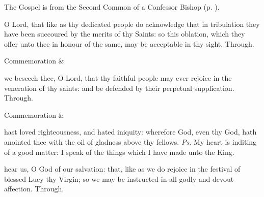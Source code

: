 
\begin{rubric}
	The Gospel is from the Second Common of a Confessor Bishop (p. \pageref{CommonConfessorBishopIIGospel}).
\end{rubric}


\secret
{} O Lord, that like as thy dedicated people do acknowledge that in tribulation they have been succoured by the merits of thy Saints: so this oblation, which they offer unto thee in honour of the same, may be acceptable in thy sight. Through.

\begin{rubric}
	Commemoration  \& 
\end{rubric}


\postcommunion
{} we beseech thee, O Lord, that thy faithful people may ever rejoice in the veneration of thy saints: and be defended by their perpetual supplication. Through.

\begin{rubric}
	Commemoration  \& 
\end{rubric}



\introit
{} hast loved righteousness, and hated iniquity: wherefore God, even thy God, hath anointed thee with the oil of gladness above thy fellows. \textit{Ps.} My heart is inditing of a good matter: I speak of the things which I have made unto the King.

\collect
{} hear us, O God of our salvation: that, like as we do rejoice in the festival of blessed Lucy thy Virgin; so we may be instructed in all godly and devout affection. Through.

